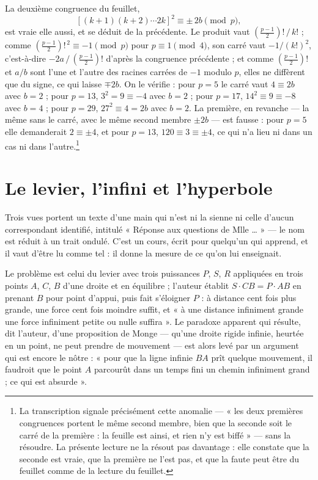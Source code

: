 \documentclass[11pt,a4paper]{article}
\begin{document}
La deuxième congruence du feuillet,
\[
  \left[(k+1)(k+2)\cdots 2k\right]^2 \equiv \pm\,2b \pmod p,
\]
est vraie elle aussi, et se déduit de la précédente. Le produit vaut
$\left(\frac{p-1}{2}\right)!\,/\,k!$ ; comme
$\left(\frac{p-1}{2}\right)!^{\,2} \equiv -1 \pmod p$ pour $p \equiv 1
\pmod 4$, son carré vaut $-1/(k!)^2$, c'est-à-dire
$-2a\,/\,\left(\frac{p-1}{2}\right)!$ d'après la congruence précédente ; et
comme $\left(\frac{p-1}{2}\right)!$ et $a/b$ sont l'une et l'autre des
racines carrées de $-1$ modulo $p$, elles ne diffèrent que du signe, ce qui
laisse $\mp 2b$. On le vérifie : pour $p = 5$ le carré vaut $4 \equiv 2b$ avec
$b = 2$ ; pour $p = 13$, $3^2 = 9 \equiv -4$ avec $b = 2$ ; pour $p = 17$,
$14^2 \equiv 9 \equiv -8$ avec $b = 4$ ; pour $p = 29$,
$27^2 \equiv 4 = 2b$ avec $b = 2$. La première, en revanche — la même sans le
carré, avec le même second membre $\pm 2b$ — est fausse : pour $p = 5$ elle
demanderait $2 \equiv \pm 4$, et pour $p = 13$, $120 \equiv 3 \equiv \pm 4$,
ce qui n'a lieu ni dans un cas ni dans l'autre.\footnote{La transcription
signale précisément cette anomalie — « les deux premières congruences portent
le même second membre, bien que la seconde soit le carré de la première : la
feuille est ainsi, et rien n'y est biffé » — sans la résoudre. La présente
lecture ne la résout pas davantage : elle constate que la seconde est vraie,
que la première ne l'est pas, et que la faute peut être du feuillet comme de
la lecture du feuillet.}

\section*{Le levier, l'infini et l'hyperbole}

Trois vues portent un texte d'une main qui n'est ni la sienne ni celle
d'aucun correspondant identifié, intitulé « Réponse aux questions de Mlle
\ldots{} » — le nom est réduit à un trait ondulé. C'est un cours, écrit pour
quelqu'un qui apprend, et il vaut d'être lu comme tel : il donne la mesure de
ce qu'on lui enseignait.

Le problème est celui du levier avec trois puissances $P$, $S$, $R$ appliquées
en trois points $A$, $C$, $B$ d'une droite et en équilibre ; l'auteur établit
$S \cdot CB = P \cdot AB$ en prenant $B$ pour point d'appui, puis fait
s'éloigner $P$ : à distance cent fois plus grande, une force cent fois moindre
suffit, et « à une distance infiniment grande une force infiniment petite ou
nulle suffira ». Le paradoxe apparent qui résulte, dit l'auteur, d'une
proposition de Monge — qu'une droite rigide infinie, heurtée en un point, ne
peut prendre de mouvement — est alors levé par un argument
qui est encore le nôtre : « pour que la ligne infinie $BA$ prît quelque
mouvement, il faudroit que le point $A$ parcourût dans un temps fini un chemin
infiniment grand ; ce qui est absurde ».
\end{document}
